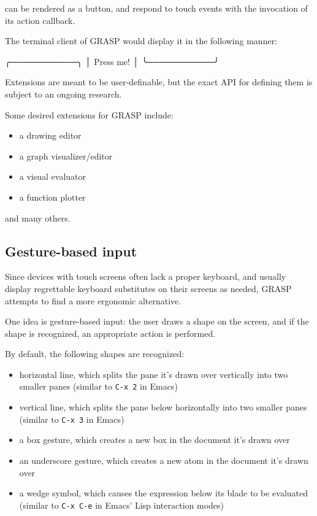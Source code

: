 \documentclass[sigconf]{acmart}
\newenvironment{Snippet}{\Verbatim[samepage=true]}{\endVerbatim}
\begin{document}
can be rendered as a button, and respond
to touch events with the invocation of its
action callback.

The terminal client of GRASP would display
it in the following manner:

\begin{Snippet}
╭───────────╮
│ Press me! │
╰───────────╯
\end{Snippet}

Extensions are meant to be user-definable, but
the exact API for defining them is subject to
an ongoing research.

Some desired extensions for GRASP include:
\begin{itemize}
\item a drawing editor
\item a graph visualizer/editor
\item a visual evaluator
\item a function plotter
\end{itemize}

and many others.

\subsection{Gesture-based input}

Since devices with touch screens often lack
a proper keyboard, and usually display regrettable
keyboard substitutes on their screens as needed,
GRASP attempts to find a more ergonomic alternative.

One idea is gesture-based input: the user draws
a shape on the screen, and if the shape is recognized,
an appropriate action is performed.

By default, the following shapes are recognized:
\begin{itemize}
\item horizontal line, which splits the pane it's
drawn over vertically into two smaller panes
(similar to \texttt{C-x 2} in Emacs)

\item vertical line, which splits the pane below
horizontally into two smaller panes
(similar to \texttt{C-x 3} in Emacs)

\item a box gesture, which creates a new box in the
document it's drawn over

\item an underscore gesture, which creates a new atom
in the document it's drawn over

\item a wedge symbol, which causes the expression
below its blade to be evaluated (similar to
\texttt{C-x C-e} in Emacs' Lisp interaction modes)
\end{itemize}
\end{document}
